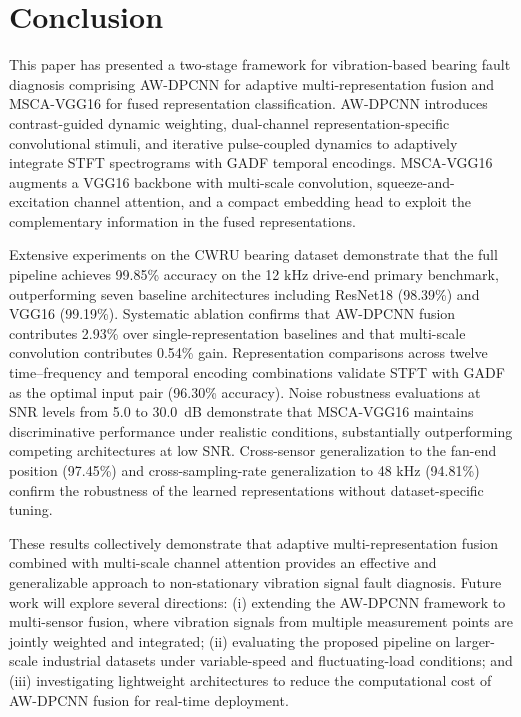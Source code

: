 \documentclass[pdflatex,sn-mathphys-num]{sn-jnl}
\theoremstyle{thmstyleone}%
\theoremstyle{thmstyletwo}%
\theoremstyle{thmstylethree}%
\begin{document}
\section{Conclusion}
\label{section5}

This paper has presented a two-stage framework for vibration-based bearing fault diagnosis comprising AW-DPCNN for adaptive multi-representation fusion and MSCA-VGG16 for fused representation classification. AW-DPCNN introduces contrast-guided dynamic weighting, dual-channel representation-specific convolutional stimuli, and iterative pulse-coupled dynamics to adaptively integrate STFT spectrograms with GADF temporal encodings. MSCA-VGG16 augments a VGG16 backbone with multi-scale convolution, squeeze-and-excitation channel attention, and a compact embedding head to exploit the complementary information in the fused representations.

Extensive experiments on the CWRU bearing dataset demonstrate that the full pipeline achieves 99.85\% accuracy on the 12 kHz drive-end primary benchmark, outperforming seven baseline architectures including ResNet18 (98.39\%) and VGG16 (99.19\%). Systematic ablation confirms that AW-DPCNN fusion contributes 2.93\% over single-representation baselines and that multi-scale convolution contributes 0.54\% gain. Representation comparisons across twelve time--frequency and temporal encoding combinations validate STFT with GADF as the optimal input pair (96.30\% accuracy). Noise robustness evaluations at SNR levels from 5.0 to 30.0~dB demonstrate that MSCA-VGG16 maintains discriminative performance under realistic conditions, substantially outperforming competing architectures at low SNR. Cross-sensor generalization to the fan-end position (97.45\%) and cross-sampling-rate generalization to 48 kHz (94.81\%) confirm the robustness of the learned representations without dataset-specific tuning.

These results collectively demonstrate that adaptive multi-representation fusion combined with multi-scale channel attention provides an effective and generalizable approach to non-stationary vibration signal fault diagnosis. Future work will explore several directions: (i) extending the AW-DPCNN framework to multi-sensor fusion, where vibration signals from multiple measurement points are jointly weighted and integrated; (ii) evaluating the proposed pipeline on larger-scale industrial datasets under variable-speed and fluctuating-load conditions; and (iii) investigating lightweight architectures to reduce the computational cost of AW-DPCNN fusion for real-time deployment.
\end{document}
